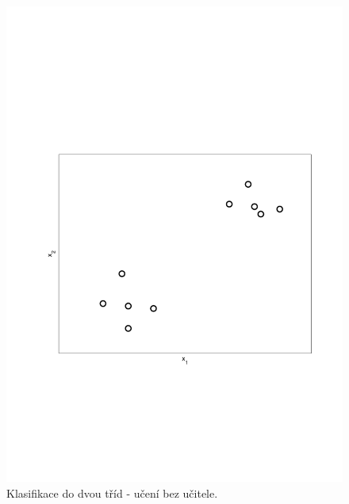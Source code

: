 \begin{figure}[!ht]
	\centering
	\begin{minipage}[t]{0.48\textwidth}
		\includegraphics[width = \textwidth, trim = 2.5cm 7cm 2cm 9cm]{./Img/UnsupervizedLearning/Intro/unsupervized.pdf}
  		\caption{Klasifikace do dvou tříd - učení bez učitele.}
		\label{fig:unsupervized}
	\end{minipage}%
	\hfill
	\begin{minipage}[t]{0.48\textwidth}

\end{minipage}
\end{figure}

